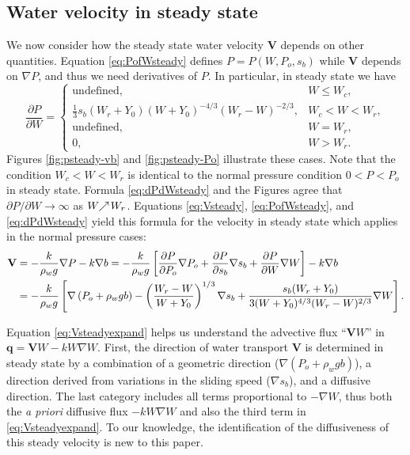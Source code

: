 \documentclass[11pt,final]{amsart}
\newcommand\bV{\mathbf{V}}
\newcommand\bq{\mathbf{q}}
\newcommand{\grad}{\nabla}
\begin{document}
\subsection*{Water velocity in steady state}  We now consider how the steady state water velocity $\bV$ depends on other quantities.  Equation \eqref{eq:PofWsteady} defines $P=P(W,P_o,s_b)$ while $\bV$ depends on $\grad P$, and thus we need derivatives of $P$.  In particular, in steady state we have
\begin{equation}
\frac{\partial P}{\partial W} =
    \begin{cases}
      \text{undefined}, & W \le W_c, \\
      \frac{1}{3} s_b (W_r + Y_0) (W+Y_0)^{-4/3} (W_r - W)^{-2/3}, & W_c < W < W_r, \\
      \text{undefined}, & W = W_r, \\
      0, & W > W_r.
    \end{cases}  \label{eq:dPdWsteady}
\end{equation}
Figures \ref{fig:psteady-vb} and \ref{fig:psteady-Po} illustrate these cases.  Note that the condition $W_c < W < W_r$ is identical to the normal pressure condition $0 < P < P_o$ in steady state.  Formula \eqref{eq:dPdWsteady} and the Figures agree that $\partial P / \partial W \to \infty$ as $W \!\!\nearrow\! W_r$.  Equations \eqref{eq:Vsteady}, \eqref{eq:PofWsteady}, and \eqref{eq:dPdWsteady} yield this formula for the velocity in steady state which applies in the normal pressure cases:
\begin{align}
\bV &= - \frac{k}{\rho_w g} \grad P - k \grad b = - \frac{k}{\rho_w g} \left[\frac{\partial P}{\partial P_o} \grad P_o + \frac{\partial P}{\partial s_b} \grad s_b + \frac{\partial P}{\partial W} \grad W\right] - k \grad b  \notag \\
    &= - \frac{k}{\rho_w g} \left[\grad \left(P_o + \rho_w g b\right) - \left(\frac{W_r - W}{W+Y_0}\right)^{1/3} \grad s_b + \frac{s_b (W_r + Y_0)}{3  (W+Y_0)^{4/3} (W_r - W)^{2/3}} \grad W\right]. \label{eq:Vsteadyexpand}
\end{align}

Equation \eqref{eq:Vsteadyexpand} helps us understand the advective flux ``$\bV W$'' in $\bq=\bV W - k W \grad W$.  First, the direction of water transport $\bV$ is determined in steady state by a combination of a geometric direction ($\grad \left(P_o + \rho_w g b\right)$), a direction derived from variations in the sliding speed ($\grad s_b$), and a diffusive direction.  The last category includes all terms proportional to $-\grad W$, thus both the \emph{a priori} diffusive flux $-k W \grad W$ and also the third term in \eqref{eq:Vsteadyexpand}.  To our knowledge, the identification of the diffusiveness of this steady velocity is new to this paper.
\end{document}
